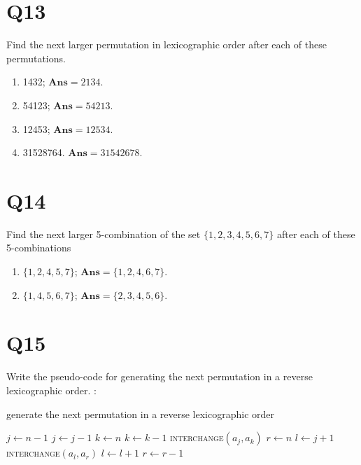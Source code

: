 \documentclass[11pt]{article}
\newenvironment{qparts}{\begin{enumerate}[{(}a{)}]}{\end{enumerate}}
\newenvironment{solution}{{\\\bf Solution}:}{\smallskip}
\begin{document}
\section*{Q13}
Find the next larger permutation in lexicographic order after each of these permutations.
\begin{qparts}
    
    \item  1432; $\textbf{Ans}=2134$.

    \item  54123; $\textbf{Ans}=54213$.

    \item  12453; $\textbf{Ans}=12534$.

    \item  31528764. $\textbf{Ans}=31542678$.
\end{qparts}

\section*{Q14}
Find the next larger 5-combination of the set $\{ 1,2,3,4,5,6,7 \}$ after each of these 5-combinations
\begin{qparts}
    
    \item  $\{ 1,2,4,5,7 \}$; $\textbf{Ans}=\{ 1,2, 4,6,7\}$.

    \item  $\{ 1,4,5,6,7 \}$; $\textbf{Ans}=\{ 2,3,4,5,6 \}$.

\end{qparts}

\section*{Q15}
Write the pseudo-code for generating the next permutation in a reverse lexicographic order.
\begin{solution}
\begin{algorithm}
    \caption{generate the next permutation in a reverse lexicographic order}
    \begin{algorithmic}
        \State $j \gets n-1$
            \State $j\gets j-1$
        \EndWhile
        \State $k\gets n$
            \State $k\gets k-1$
        \EndWhile
        \State \textsc{interchange}$(a_{j},a_{k})$
        \State $r\gets n$
        \State $l \gets j+1$
            \State \textsc{interchange}$(a_{l},a_{r})$
            \State $l\gets l+1$
            \State $r\gets r-1$
        \EndWhile
    \EndProcedure
    \end{algorithmic}
\end{algorithm}
\end{solution}
\end{document}
